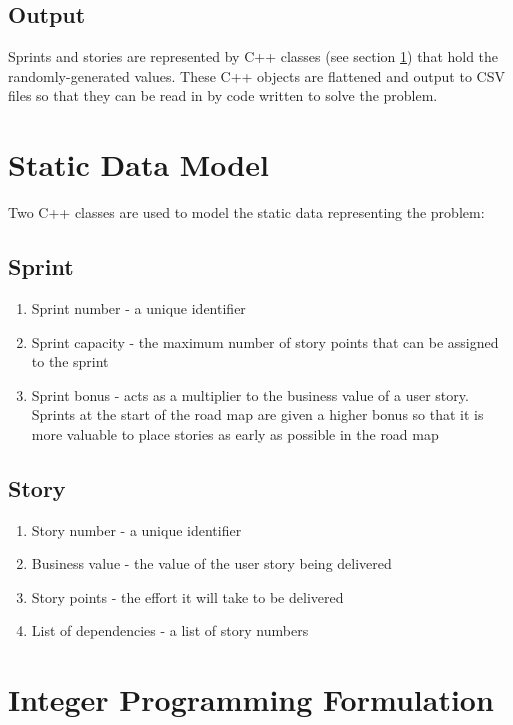 \subsection{Output}
Sprints and stories are represented by C++ classes (see section \ref{sec:Model}) that hold the randomly-generated values. These C++ objects are flattened and output to CSV files so that they can be read in by code written to solve the problem.

\section{Static Data Model}\label{sec:Model}
Two C++ classes are used to model the static data representing the problem:

\subsection{Sprint}
\begin{enumerate}
    \item Sprint number - a unique identifier
    \item Sprint capacity - the maximum number of story points that can be assigned to the sprint
    \item Sprint bonus - acts as a multiplier to the business value of a user story. Sprints at the start of the road map are given a higher bonus so that it is more valuable to place stories as early as possible in the road map
\end{enumerate}

\subsection{Story}
\begin{enumerate}
    \item Story number - a unique identifier
    \item Business value - the value of the user story being delivered
    \item Story points - the effort it will take to be delivered
    \item List of dependencies - a list of story numbers
\end{enumerate}

\section{Integer Programming Formulation}
\label{sec:integer_prog_formulation}

